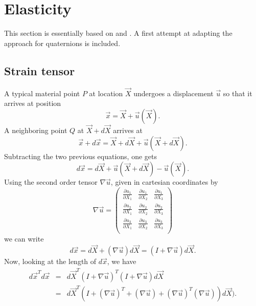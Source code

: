 %
\section{Elasticity}
\label{sec:elasticityappendix}

This section is essentially based on \cite{LaiRubinKrempl} and
\cite{HBSMZC07}.  A first attempt at adapting the approach for
quaternions is included.

\subsection{Strain tensor}

A typical material point $P$ at location $\vec X$ undergoes a
displacement $\vec u$ so that it arrives at position
%
\begin{equation}
  \vec x=\vec X+\vec u(\vec X).
\end{equation}
%
A neighboring point $Q$ at $\vec X+d\vec X$ arrives at
%
\begin{equation}
  \vec x+d\vec x=\vec X+d\vec X+\vec u(\vec X+d\vec X).
\end{equation}
%
Subtracting the two previous equations, one gets
%
\begin{equation}
  d\vec x=d\vec X+\vec u(\vec X+d\vec X)-\vec u(\vec X).
\end{equation}
%
Using the second order tensor $\nabla\vec u$, given in cartesian coordinates by
%
\begin{equation}
  \nabla\vec u=
  \left(
     \begin{array}{ccc}
       \frac{\partial u_1}{\partial X_1} & \frac{\partial u_1}{\partial X_2} & \frac{\partial u_1}{\partial X_3} \\
       \frac{\partial u_2}{\partial X_1} & \frac{\partial u_2}{\partial X_2} & \frac{\partial u_2}{\partial X_3} \\
       \frac{\partial u_3}{\partial X_1} & \frac{\partial u_3}{\partial X_2} & \frac{\partial u_3}{\partial X_3} \\
     \end{array}
  \right)
\end{equation}
%
we can write
%
\begin{equation}
  d\vec x=d\vec X+(\nabla\vec u) d\vec X=(I+\nabla\vec u)d\vec X.
\end{equation}
%
Now, looking at the length of $d\vec x$, we have
%
\begin{eqnarray}
  d\vec x^T d\vec x&=&d\vec X^T (I+\nabla\vec u)^T (I+\nabla\vec u) d\vec X \nonumber \\
  &=&d\vec X^T \left(
  I+(\nabla\vec u)^T+(\nabla\vec u)+(\nabla\vec u)^T(\nabla\vec u)
  \right) d\vec X).
\end{eqnarray}

